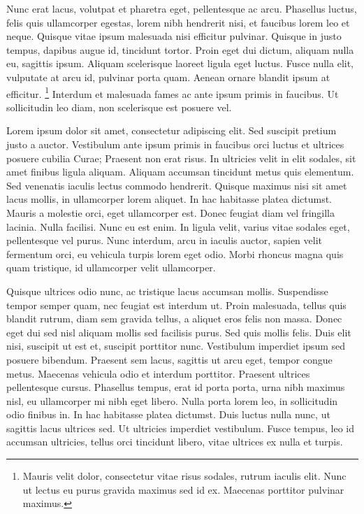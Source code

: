 Nunc erat lacus, volutpat et pharetra eget, pellentesque ac arcu. Phasellus luctus, felis quis ullamcorper egestas, lorem nibh hendrerit nisi, et faucibus lorem leo et neque. Quisque vitae ipsum malesuada nisi efficitur pulvinar. Quisque in justo tempus, dapibus augue id, tincidunt tortor. Proin eget dui dictum, aliquam nulla eu, sagittis ipsum. Aliquam scelerisque laoreet ligula eget luctus. Fusce nulla elit, vulputate at arcu id, pulvinar porta quam. Aenean ornare blandit ipsum at efficitur. \footnote{Mauris velit dolor, consectetur vitae risus sodales, rutrum iaculis elit. Nunc ut lectus eu purus gravida maximus sed id ex. Maecenas porttitor pulvinar maximus.} Interdum et malesuada fames ac ante ipsum primis in faucibus. Ut sollicitudin leo diam, non scelerisque est posuere vel.

Lorem ipsum dolor sit amet, consectetur adipiscing elit. Sed suscipit pretium justo a auctor. Vestibulum ante ipsum primis in faucibus orci luctus et ultrices posuere cubilia Curae; Praesent non erat risus. In ultricies velit in elit sodales, sit amet finibus ligula aliquam. Aliquam accumsan tincidunt metus quis elementum. Sed venenatis iaculis lectus commodo hendrerit. Quisque maximus nisi sit amet lacus mollis, in ullamcorper lorem aliquet. In hac habitasse platea dictumst. Mauris a molestie orci, eget ullamcorper est. Donec feugiat diam vel fringilla lacinia. Nulla facilisi. Nunc eu est enim. In ligula velit, varius vitae sodales eget, pellentesque vel purus. Nunc interdum, arcu in iaculis auctor, sapien velit fermentum orci, eu vehicula turpis lorem eget odio. Morbi rhoncus magna quis quam tristique, id ullamcorper velit ullamcorper.

Quisque ultrices odio nunc, ac tristique lacus accumsan mollis. Suspendisse tempor semper quam, nec feugiat est interdum ut. Proin malesuada, tellus quis blandit rutrum, diam sem gravida tellus, a aliquet eros felis non massa. Donec eget dui sed nisl aliquam mollis sed facilisis purus. Sed quis mollis felis. Duis elit nisi, suscipit ut est et, suscipit porttitor nunc. Vestibulum imperdiet ipsum sed posuere bibendum. Praesent sem lacus, sagittis ut arcu eget, tempor congue metus. Maecenas vehicula odio et interdum porttitor. Praesent ultrices pellentesque cursus. Phasellus tempus, erat id porta porta, urna nibh maximus nisl, eu ullamcorper mi nibh eget libero. Nulla porta lorem leo, in sollicitudin odio finibus in. In hac habitasse platea dictumst. Duis luctus nulla nunc, ut sagittis lacus ultrices sed. Ut ultricies imperdiet vestibulum. Fusce tempus, leo id accumsan ultricies, tellus orci tincidunt libero, vitae ultrices ex nulla et turpis.

